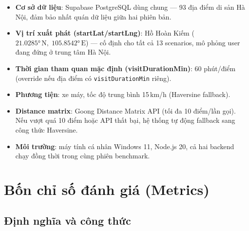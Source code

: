 \documentclass[12pt,a4paper]{article}
\begin{document}
\begin{itemize}[leftmargin=*]
  \item \textbf{Cơ sở dữ liệu}: Supabase PostgreSQL dùng chung --- 93 địa điểm di sản Hà Nội, đảm bảo nhất quán dữ liệu giữa hai phiên bản.
  \item \textbf{Vị trí xuất phát (startLat/startLng)}: Hồ Hoàn Kiếm
        ($21.0285°\,\text{N},\; 105.8542°\,\text{E}$) --- cố định cho tất cả 13 scenarios,
        mô phỏng user đang đứng ở trung tâm Hà Nội.
  \item \textbf{Thời gian tham quan mặc định (visitDurationMin)}: 60 phút/điểm (override nếu địa điểm có \texttt{visitDurationMin} riêng).
  \item \textbf{Phương tiện}: xe máy, tốc độ trung bình 15\,km/h (Haversine fallback).
  \item \textbf{Distance matrix}: Goong Distance Matrix API (tối đa 10 điểm/lần gọi). Nếu vượt quá 10 điểm hoặc API thất bại, hệ thống tự động fallback sang công thức Haversine.
  \item \textbf{Môi trường}: máy tính cá nhân Windows 11, Node.js 20, cả hai backend chạy đồng thời trong cùng phiên benchmark.
\end{itemize}

\section{Bốn chỉ số đánh giá (Metrics)}
\label{sec:metrics}

\subsection{Định nghĩa và công thức}
\end{document}
